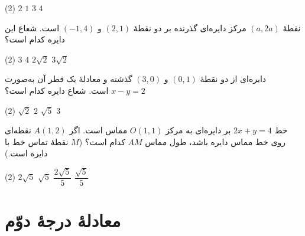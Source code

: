 \begin{moreactivities}
\begin{tasks}(2)
    \task \(2\)
    \task \(1\)
    \task \(3\)
    \task \(4\)
\end{tasks}


\item نقطۀ \((a,2a)\) مرکز دایره‌ای گذرنده بر دو نقطۀ
\((2,1)\) و \((-1,4)\) است.
شعاع این دایره کدام است؟

\begin{tasks}(2)
    \task \(3\)
    \task \(4\)
    \task \(2\sqrt{2}\)
    \task \(3\sqrt{2}\)
\end{tasks}


\item دایره‌ای از دو نقطۀ \((0,1)\) و \((3,0)\) گذشته
و معادلۀ یک قطر آن به‌صورت
$x-y=2$
است. شعاع دایره کدام است؟

\begin{tasks}(2)
    \task \(\sqrt{2}\)
    \task \(2\)
    \task \(\sqrt{5}\)
    \task \(3\)
\end{tasks}


\item خط
$2x+y=4$
بر دایره‌ای به مرکز \(O(1,1)\) مماس است.
اگر \(A(1,2)\) نقطه‌ای روی خط مماس دایره باشد،
طول مماس \(AM\) کدام است؟
(\(M\) نقطۀ تماس خط با دایره است.)

\begin{tasks}(2)
    \task \(2\sqrt{5}\)
    \task \(\sqrt{5}\)
    \task \(\dfrac{2\sqrt{5}}{5}\)
    \task \(\dfrac{\sqrt{5}}{5}\)
\end{tasks}
\end{moreactivities}

\section{معادلۀ درجۀ دوّم}


